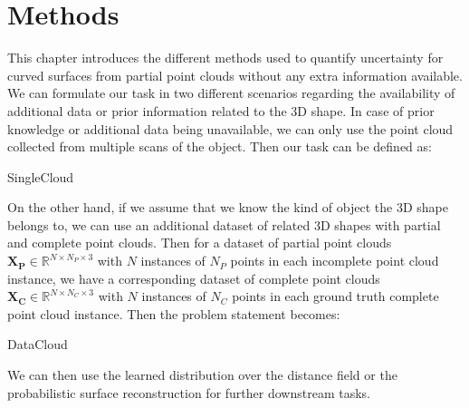 \chapter{Methods}\label{ch:methods}
This chapter introduces the different methods used to quantify uncertainty for curved surfaces from partial point clouds without any extra information available. We can formulate our task in two different scenarios regarding the availability of additional data or prior information related to the 3D shape. In case of prior knowledge or additional data being unavailable, we can only use the point cloud collected from multiple scans of the object. Then our task can be defined as:
\begin{problemnotitle}{SingleCloud}{}
\end{problemnotitle}
\newline

On the other hand, if we assume that we know the kind of object the 3D shape belongs to, we can use an additional dataset of related 3D shapes with partial and complete point clouds. Then for a dataset of partial point clouds $\mathbf{X_P} \in \mathbb{R}^{N \times N_P \times 3}$ with $N$ instances of $N_P$ points in each incomplete point cloud instance, we have a corresponding dataset of complete point clouds $\mathbf{X_C} \in \mathbb{R}^{N \times N_C \times 3}$ with $N$ instances of $N_C$ points in each ground truth complete point cloud instance. Then the problem statement becomes:
\begin{problemnotitle}{DataCloud}{}
\end{problemnotitle}
\newline

We can then use the learned distribution over the distance field or the probabilistic surface reconstruction for further downstream tasks.



